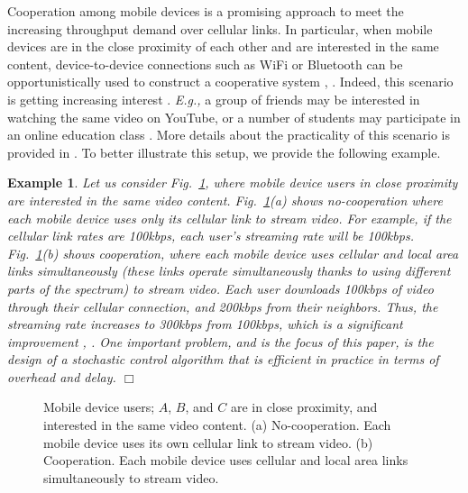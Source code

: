 \documentclass[conference]{IEEEtran}
\newcommand{\Eg}{{\em E.g., }}
\newtheorem{example}{Example}
\begin{document}
Cooperation among mobile devices is a promising approach to meet the increasing throughput demand over cellular links. In particular, when mobile devices are in the close proximity of each other and are interested in the same content, device-to-device connections such as WiFi or Bluetooth can be opportunistically used to construct a cooperative system \cite{microcast}, \cite{microcast_allerton}. Indeed, this scenario is getting increasing interest \cite{microcast}. \Eg a group of friends may be interested in watching the same video on YouTube, or a number of students may participate in an online education class \cite{microcast}. More details about the practicality of this scenario is provided in \cite{microcast}. To better illustrate this setup, we provide the following example.

\begin{example}\label{ex1}
Let us consider Fig.~\ref{fig:intro_example}, where mobile device users in close proximity are interested in the same video content. Fig.~\ref{fig:intro_example}(a) shows no-cooperation where each mobile device uses only its cellular link to stream video. For example, if the cellular link rates are 100kbps, each user's streaming rate will be 100kbps. Fig.~\ref{fig:intro_example}(b) shows cooperation, where each mobile device uses cellular and local area links simultaneously (these links operate simultaneously thanks to using different parts of the spectrum) to stream video. Each user downloads 100kbps of video through their cellular connection, and 200kbps from their neighbors. Thus, the streaming rate increases to 300kbps from 100kbps, which is a significant improvement \cite{microcast}, \cite{microcast_allerton}. One important problem, and is the focus of this paper, is the design of a stochastic control algorithm that is efficient in practice in terms of overhead and delay.
\hfill $\Box$
\end{example}


\begin{figure}[t!]
\centering
{} \hspace{10pt}
\vspace{-5pt}
\caption{Mobile device users; $A$, $B$, and $C$ are in close proximity, and interested in the same video content. (a) No-cooperation. Each mobile device uses its own cellular link to stream video. (b) Cooperation. Each mobile device uses cellular and local area links simultaneously to stream video.
}
\vspace{-10pt}
\label{fig:intro_example}
\end{figure}
\end{document}
